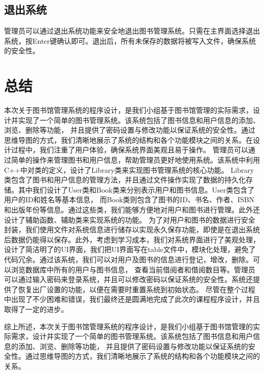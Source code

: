 \documentclass{article}
\begin{document}
\subsection{退出系统}
管理员可以通过退出系统功能来安全地退出图书管理系统。只需在主界面选择退出系统，按Enter键确认即可。退出后，所有未保存的数据将被写入文件，确保系统的安全性。

\section{总结}

本次关于图书馆管理系统的程序设计，是我们小组基于图书馆管理的实际需求，设计并实现了一个简单的图书管理系统。该系统包括了图书信息和用户信息的添加、浏览、删除等功能，
并且提供了密码设置与修改功能以保证系统的安全性。通过思维导图的方式，我们清晰地展示了系统的结构和各个功能模块之间的关系。在设计过程中，我们注重了用户体验，确保系统界面美观且易于操作。
管理员可以通过简单的操作来管理图书和用户信息，帮助管理员更好地使用系统。该系统中利用C++中对类的定义，设计了Library类来实现图书管理系统的核心功能。
Library类包含了图书和用户信息的管理方法，并且通过文件操作实现了数据的持久化存储。其中我们设计了User类和Book类来分别表示用户和图书信息。User类包含了用户的ID和姓名等基本信息，
而Book类则包含了图书的ID、书名、作者、ISBN和出版年份等信息。通过这些类，我们能够方便地对用户和图书进行管理。此外还设计了辅助函数、辅助类来实现系统的功能。
为了对用户和图书的数据进行安全封装，我们使用文件对系统信息进行储存以实现永久保存功能，即使是在退出系统后数据仍能得以保存。此外，考虑到学习成本，我们对系统界面进行了美观处理，
设计了简洁明了的UI界面，我们把UI界面写在table文件中，模块化处理，避免了代码冗余。通过该系统，我们可以对用户及图书的信息进行登记，增改，删除。可以浏览数据库中所有的用户与图书信息，
查看当前借阅者和借阅数目等。管理员可以通过输入密码来登录系统，并且可以修改密码以保证系统的安全性。系统还提供了恢复出厂设置的功能，以便在需要时重置系统到初始状态。
尽管在整个过程中出现了不少困难和错误，我们最终还是圆满地完成了此次的课程程序设计，并且取得了一定的进步。

综上所述，本次关于图书馆管理系统的程序设计，是我们小组基于图书馆管理的实际需求，设计并实现了一个简单的图书管理系统。该系统包括了图书信息和用户信息的添加、浏览、删除等功能，
并且提供了密码设置与修改功能以保证系统的安全性。通过思维导图的方式，我们清晰地展示了系统的结构和各个功能模块之间的关系。
\end{document}
